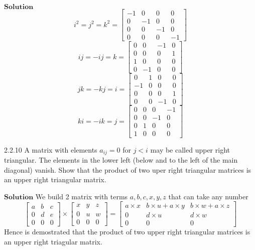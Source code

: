 \documentclass{article}
\begin{document}
\begin{flushleft}
$\boxed{\textbf{Solution}}$ 
$$i^2=j^2 = k^2 =\begin{bmatrix}{-1} & {0} & {0} & {0} \\ {0} & {-1} & {0} & {0} \\ {0} & {0} & {-1} & {0} \\ {0} & {0} & {0} & {-1}\end{bmatrix}$$
$$ij = -ij = k =\begin{bmatrix}{0} & {0} & {-1} & {0} \\ {0} & {0} & {0} & {1} \\ {1} & {0} & {0} & {0} \\ {0} & {-1} & {0} & {0}\end{bmatrix} $$
$$jk=-kj=i=\begin{bmatrix}{0} & {1} & {0} & {0} \\ {-1} & {0} & {0} & {0} \\ {0} & {0} & {0} & {1} \\ {0} & {0} & {-1} & {0}\end{bmatrix}$$
$$ki=-ik=j = \begin{bmatrix}{0} & {0} & {0} & {-1} \\ {0} & {0} & {-1} & {0} \\ {0} & {1} & {0} & {0} \\ {1} & {0} & {0} & {0}\end{bmatrix}$$

\newpage


\begin{mybox}{2.2.10}
A matrix with elements $a_{i j}=0$ for $j<i$ may be called upper right triangular. The
elements in the lower left (below and to the left of the main diagonal) vanish. Show that
the product of two uper right triangular matrices is an upper right triangular matrix. 
\end{mybox}



$\boxed{\textbf{Solution}}$ We build 2 matrix with terms $a,b,c,x,y,z$ that can take any number
$$\begin{bmatrix}{a} & {b} & {c} \\ {0} & {d} & {e} \\ {0} & {0} & {0}\end{bmatrix} \times\begin{bmatrix}{x} & {y} & {z} \\ {0} & {u} & {w} \\ {0} & {0} & {0}\end{bmatrix}=\begin{bmatrix}{a\times x} & {b \times u+a\times y} & {b \times w+a\times z} \\ {0} & {d \times u} & {d \times w} \\ {0} & {0} & {0}\end{bmatrix}$$
Hence is demostrated that the product of two upper right triangular matrices is an upper right triagular matrix.



\end{flushleft}
\end{document}
